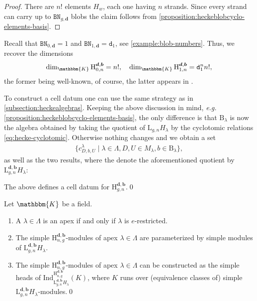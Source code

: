 \documentclass[a4paper,11pt]{amsart}
\newcommand{\eg}{\textsl{e.g.}}
\newcommand{\setstuff}[1]{\mathrm{#1}}
\newcommand{\KK}{\mathbbm{K}}
\newcommand{\bsym}[1]{\boldsymbol{#1}}
\newcommand{\varsym}[1]{\mathtt{#1}}
\newcommand{\bpar}{\bsym{b}}
\newcommand{\dpar}{\bsym{d}}
\newcommand{\dvar}{\varsym{d}}
\newcommand{\bbvar}{\varsym{BN}}
\numberwithin{equation}{section}
\let\fullref\autoref
\begin{document}
\begin{proof}
There are $n!$ elements $H_{w}$, each one having $n$ strands.
Since every strand can carry up 
to $\bbvar_{g,\dpar}$ blobs the 
claim follows from \fullref{proposition:heckeblobcyclo-elements-basis}. 
\end{proof}

\begin{remark}
Recall that $\bbvar_{0,\dpar}=1$ and $\bbvar_{1,\dpar}=\dvar_{1}$, see 
\fullref{example:blob-numbers}. Thus, we recover the dimensions
\begin{gather*}
\dim_{\KK}\setstuff{H}_{0,n}^{\dpar,\bpar}=n!,
\quad
\dim_{\KK}\setstuff{H}_{1,n}^{\dpar,\bpar}=\dvar_{1}^{n}n!,
\end{gather*}
the former being well-known, of course, the latter 
appears in \cite[(3.10)]{ArKo-hecke-algebra}.
\end{remark}

To construct a cell datum one can use the same strategy 
as in \fullref{subsection:heckealgebras}. 
Keeping the above discussion in mind, {\eg} 
\fullref{proposition:heckeblobcyclo-elements-basis}, the 
only difference is that $\setstuff{B}_{\lambda}$ 
is now the algebra obtained by taking the quotient of
$\setstuff{L}_{g,n}H_{\lambda}$ by 
the cyclotomic relations \eqref{eq:hecke-cyclotomic}. 
Otherwise nothing changes and we obtain a set 
\begin{gather*}
\{c_{D,b,U}^{\lambda}\mid\lambda\in\Lambda,D,U\in M_{\lambda},
b\in\setstuff{B}_{\lambda}\},
\end{gather*} 
as well as the two results, where the denote the 
aforementioned quotient by $\setstuff{L}_{g,n}^{\dpar,\bpar}H_{\lambda}$:

\begin{proposition}
The above defines a 
cell datum for $\setstuff{H}_{g,n}^{\dpar,\bpar}$.\qed
\end{proposition}

\begin{theorem}\label{theorem:checke}
Let $\KK$ be a field.
\begin{enumerate}

\item A $\lambda\in\Lambda$ is an apex 
if and only if $\lambda$ is $e$-restricted.

\item The simple $\setstuff{H}_{n,g}^{\dpar,\bpar}$-modules of 
apex $\lambda\in\Lambda$ 
are parameterized by simple modules of $\setstuff{L}_{g,n}^{\dpar,\bpar}H_{\lambda}$.

\item The simple $\setstuff{H}_{n,g}^{\dpar,\bpar}$-modules of 
apex $\lambda\in\Lambda$ can be constructed as 
the simple heads of
$\mathrm{Ind}_{\setstuff{L}_{g,n}^{\dpar,\bpar}
H_{\lambda}}^{\setstuff{H}_{n,g}^{\dpar,\bpar}}(K)$, 
where $K$ runs over (equivalence classes of) 
simple $\setstuff{L}_{g,n}^{\dpar,\bpar}H_{\lambda}$-modules.\qed

\end{enumerate}
\end{theorem}
\end{document}
